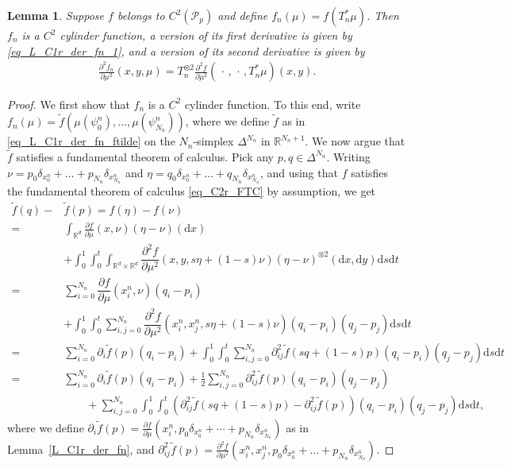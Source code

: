 \documentclass{article}
\newtheorem{lemma}[theorem]{Lemma}
\theoremstyle{definition}
\numberwithin{equation}{section}
\numberwithin{theorem}{section}
\newcommand{\pian}[2]{\dfrac{\partial #1}{\partial #2}}
\newcommand{\piann}[2]{\dfrac{\partial^{2}#1}{\partial #2^{2}}}
\newcommand{\R}{\mathbb{R}}
\newcommand{\dx}{\mathrm{d}x}
\newcommand{\dy}{\mathrm{d}y}
\newcommand{\ds}{\mathrm{d}s}
\newcommand{\dt}{\mathrm{d}t}
\newcommand{\Pcal}{{\mathcal P}}
\newcommand{\fdot}{{\,\cdot\,}}
\begin{document}
\begin{lemma}\label{L_C2r_der_fn}
Suppose $f$ belongs to $C^2(\Pcal_p)$ and define $f_n(\mu)=f(T_n^*\mu)$. Then $f_n$ is a $C^2$ cylinder function, a version of its first derivative is given by \eqref{eq_L_C1r_der_fn_1}, and a version of its second derivative is given by
\begin{align}\label{eq_L_C2r_der_fn_2}
\frac{\partial^2f_n}{\partial\mu^2}(x,y,\mu) = T_n^{\otimes 2} \frac{\partial^2f}{\partial\mu^2}(\fdot,\fdot,T_n^*\mu)(x,y).
\end{align}
\end{lemma}


\begin{proof}
We first show that $f_n$ is a $C^2$ cylinder function. To this end, write $f_n(\mu) = \tilde f(\mu(\psi^n_0),\ldots,\mu(\psi^n_{N_n}))$, where we define $\tilde f$ as in \eqref{eq_L_C1r_der_fn_ftilde} on the $N_n$-simplex $\Delta^{N_n}$ in $\R^{N_n+1}$.
We now argue that $\tilde f$ satisfies a fundamental theorem of calculus. Pick any $p,q\in\Delta^{N_n}$. Writing $\nu=p_0\delta_{x^n_0} + \ldots + p_{N_n}\delta_{x^n_{N_n}}$ and $\eta=q_0\delta_{x^n_0} + \ldots + q_{N_n}\delta_{x^n_{N_n}}$, and using that $f$ satisfies the fundamental theorem of calculus \eqref{eq_C2r_FTC} by assumption, we get
\begin{align*}
\tilde f(q)- & \tilde f(p) 
= f(\eta) - f(\nu) \\
=& \int_{\R^d} \frac{\partial f}{\partial\mu}(x,\nu)(\eta-\nu)(\dx)\\
&+\int_0^1\int_0^t \int_{\R^d\times\R^d} \piann{f}{\mu}(x,y,s\eta + (1-s)\nu)(\eta-\nu)^{\otimes 2}(\dx,\dy)\ds\dt \\
=& \sum_{i=0}^{N_n}  \pian{f}{\mu}(x^n_i,\nu)(q_i-p_i)\\
&+\int_0^1\int_0^t \sum_{i,j=0}^{N_n}  \piann{f}{\mu}(x^n_i,x^n_j,s\eta + (1-s)\nu)(q_i-p_i)(q_j-p_j)\ds\dt \\
=& \sum_{i=0}^{N_n} \partial_i\tilde f(p)(q_i-p_i)
+ \int_0^1\int_0^t \sum_{i,j=0}^{N_n} \partial^2_{ij}\tilde f(sq+(1-s)p)(q_i-p_i)(q_j-p_j)\ds\dt\\
=& \sum_{i=0}^{N_n} \partial_i\tilde f(p)(q_i-p_i)
+\frac 1 2 \sum_{i,j=0}^{N_n} \partial^2_{ij}\tilde f(p)(q_i-p_i)(q_j-p_j)\\
&\qquad+ \sum_{i,j=0}^{N_n}\int_0^1\int_0^t ( \partial^2_{ij}\tilde f(sq+(1-s)p)-  \partial^2_{ij}\tilde f(p))(q_i-p_i)(q_j-p_j)\ds\dt,
\end{align*}
where we define $\partial_i\tilde f(p)=\frac{\partial f}{\partial\mu}(x^n_i,p_0\delta_{x^n_0}+\cdots+p_{N_n}\delta_{x^n_{N_n}})$ as in Lemma~\ref{L_C1r_der_fn}, and $\partial^2_{ij}\tilde f(p)=\frac{\partial^2 f}{\partial\mu^2}(x^n_i,x^n_j,p_0\delta_{x^n_0}+\ldots+p_{N_n}\delta_{x^n_{N_n}})$.

\end{proof}
\end{document}

